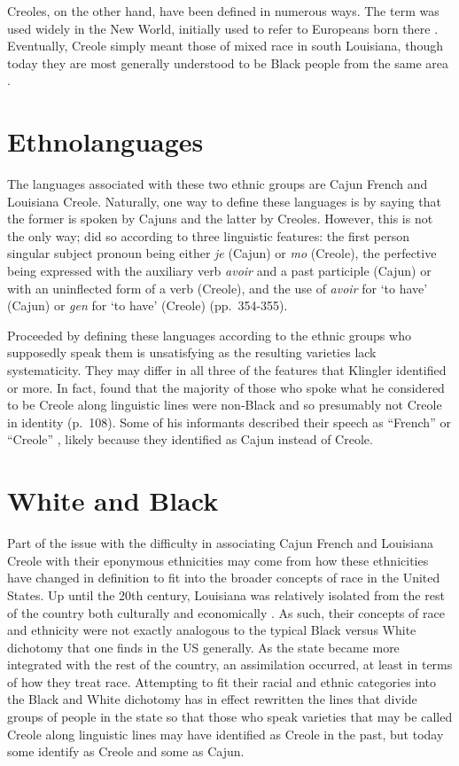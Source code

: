 \documentclass{article}
\newcommand{\lexi}[1]{\textit{#1}}
\newcommand{\gloss}[1]{`#1'}
\begin{document}
    Creoles, on the other hand, have been defined in numerous ways.
    The term was used widely in the New World, initially used to refer to Europeans born there \parencite[Corominas 1967, as cited in][p.~16]{holm_introduction_2000}.
    Eventually, Creole simply meant those of mixed race in south Louisiana, though today they are most generally understood to be Black people from the same area \parencite[Dominguez, 1977, as cited in][p.~11]{neumann_creole_1985}.

  \section{Ethnolanguages}
    The languages associated with these two ethnic groups are Cajun French and Louisiana Creole.
    Naturally, one way to define these languages is by saying that the former is spoken by Cajuns and the latter by Creoles.
    However, this is not the only way; \textcite{klingler_probleme_2005} did so according to three linguistic features: the first person singular subject pronoun being either \lexi{je} (Cajun) or \lexi{mo} (Creole), the perfective being expressed with the auxiliary verb \lexi{avoir} and a past participle (Cajun) or with an uninflected form of a verb (Creole), and the use of \lexi{avoir} for \gloss{to have} (Cajun) or \lexi{gen} for \gloss{to have} (Creole) (pp.~354-355).

    Proceeded by defining these languages according to the ethnic groups who supposedly speak them is unsatisfying as the resulting varieties lack systematicity.
    They may differ in all three of the features that Klingler identified or more.
    In fact, \textcite{klingler_if_2003} found that the majority of those who spoke what he considered to be Creole along linguistic lines were non-Black and so presumably not Creole in identity (p.~108).
    Some of his informants described their speech as ``French'' or ``Creole'' \parencite[p.~128]{klingler_if_2003}, likely because they identified as Cajun instead of Creole.

  \section{White and Black}
    Part of the issue with the difficulty in associating Cajun French and Louisiana Creole with their eponymous ethnicities may come from how these ethnicities have changed in definition to fit into the broader concepts of race in the United States.
    Up until the 20th century, Louisiana was relatively isolated from the rest of the country both culturally and economically \parencite[p.~28]{johnson_louisiana_1976}.
    As such, their concepts of race and ethnicity were not exactly analogous to the typical Black versus White dichotomy that one finds in the US generally.
    As the state became more integrated with the rest of the country, an assimilation occurred, at least in terms of how they treat race.
    Attempting to fit their racial and ethnic categories into the Black and White dichotomy has in effect rewritten the lines that divide groups of people in the state so that those who speak varieties that may be called Creole along linguistic lines may have identified as Creole in the past, but today some identify as Creole and some as Cajun.
    \printbibliography
\end{document}
